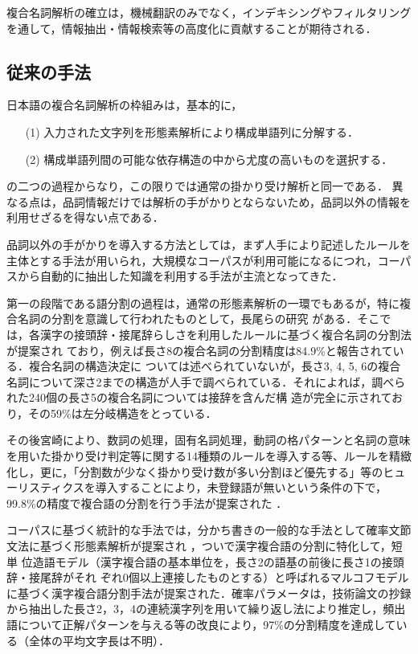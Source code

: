 複合名詞解析の確立は，機械翻訳のみでなく，インデキシングやフィルタリングを通して，情報抽出・情報検索等の高度化に貢献することが期待される．

\subsection{従来の手法}\label{従来の手法}
日本語の複合名詞解析の枠組みは，基本的に，

\begin{itemize}
 \item[(1)] 入力された文字列を形態素解析により構成単語列に分解する．
 \item[(2)] 構成単語列間の可能な依存構造の中から尤度の高いものを選択する．
\end{itemize}
の二つの過程からなり，この限りでは通常の掛かり受け解析と同一である．
異なる点は，品詞情報だけでは解析の手がかりとならないため，品詞以外の情報を利用せざるを得ない点である．

品詞以外の手がかりを導入する方法としては，まず人手により記述したルールを主体とする手法が用いられ，大規模なコーパスが利用可能になるにつれ，コーパスから自動的に抽出した知識を利用する手法が主流となってきた．

第一の段階である語分割の過程は，通常の形態素解析の一環でもあるが，特に複合名詞の分割を意識して行われたものとして，長尾らの研究 \cite{長尾1978} がある．そこでは，各漢字の接頭辞・接尾辞らしさを利用したルールに基づく複合名詞の分割法が提案され\break
ており，例えば長さ8の複合名詞の分割精度は84.9\%と報告されている．複合名詞の構造決定に\break
ついては述べられていないが，長さ3, 4, 5, 6の複合名詞について深さ2までの構造が人手で調べられている．それによれば，調べられた240個の長さ5の複合名詞については接辞を含んだ構\break
造が完全に示されており，その59\%は左分岐構造をとっている．

その後宮崎により、数詞の処理，固有名詞処理，動詞の格パターンと名詞の意味を用いた掛かり受け判定等に関する14種類のルールを導入する等、ルールを精緻化し，更に，「分割数が少なく掛かり受け数が多い分割ほど優先する」等のヒューリスティクスを導入することにより，未登録語が無いという条件の下で，99.8\%の精度で複合語の分割を行う手法が提案された \cite{宮崎1984}．

コーパスに基づく統計的な手法では，分かち書きの一般的な手法として確率文節文法に基づく形態素解析が提案され \cite{松延1986}，ついで漢字複合語の分割に特化して，短単\break
位造語モデル（漢字複合語の基本単位を，長さ2の語基の前後に長さ1の接頭辞・接尾辞がそれ\break
ぞれ0個以上連接したものとする）と呼ばれるマルコフモデルに基づく漢字複合語分割手法が提案された\cite{武田1987}．確率パラメータは，技術論文の抄録から抽出した長さ2，3，4の連続漢字列を用いて繰り返し法により推定し，頻出語について正解パターンを与える等の改良により，97\%の分割精度を達成している（全体の平均文字長は不明）．

